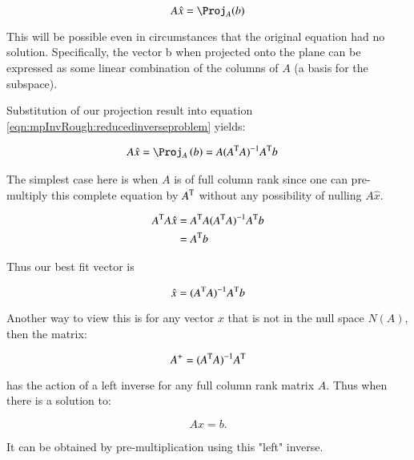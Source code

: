 \begin{equation}\label{eqn:mpInvRough:reducedinverseproblem}
A \hat{x} = \Proj_A(b)
\end{equation}


This will be possible even in circumstances that the original equation had no solution.  Specifically, the vector b when projected onto the plane can be expressed as some
linear combination of the columns of $A$ (a basis for the subspace).

Substitution of our projection result into equation \ref{eqn:mpInvRough:reducedinverseproblem} yields:

\begin{align*}
A \hat{x} 
&= \Proj_{A}\left(b\right) = A (A^\T A)^{-1} A^\T b
\end{align*}

The simplest case here is when $A$ is of full column rank since one can pre-multiply this complete equation by $A^{\text{T}}$ without any possibility of nulling
$A \hat{x}$.

\begin{align*}
A^{\text{T}} A \hat{x} 
&= A^{\text{T}} A (A^{\text{T}} A)^{-1} A^{\text{T}} b \\
&= A^{\text{T}} b \\
\end{align*}

Thus our best fit vector is

\begin{equation}
\hat{x} 
= (A^{\text{T}} A)^{-1} A^{\text{T}} b
\end{equation}

Another way to view this is for any vector $x$ that is not in the null space $N(A)$, then the matrix:

\begin{equation}
A^{+}= (A^{\text{T}} A)^{-1} A^{\text{T}}
\end{equation}

has the action of a left inverse for any full column rank matrix $A$.  Thus when there is a solution to:

\begin{equation}
A x = b.
\end{equation}

It can be obtained by pre-multiplication using this "left" inverse.


